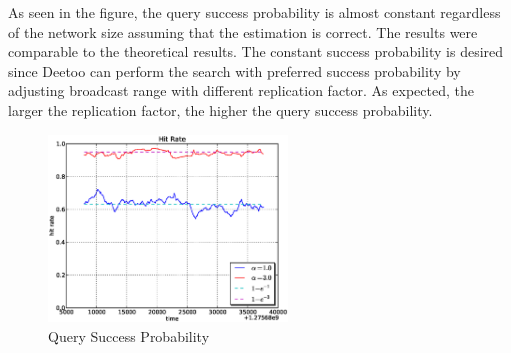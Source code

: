 \documentclass[9.5pt,journal,final,finalsubmission,twocolumn]{IEEEtran}
\begin{document}
As seen in the figure, the query success probability is almost constant 
regardless of the network size assuming that the estimation is correct.
The results were comparable to the theoretical results.
The constant success probability is desired since Deetoo can perform 
the search with preferred success probability by
adjusting broadcast range with different replication factor.
As expected, the larger the replication factor, the higher the query 
success probability.
\begin{figure}[ht]
\centering
\includegraphics[width=2.5in]{plab_hit}
\caption{Query Success Probability}
\label{fig:plab_hit}
\end{figure}
\end{document}
